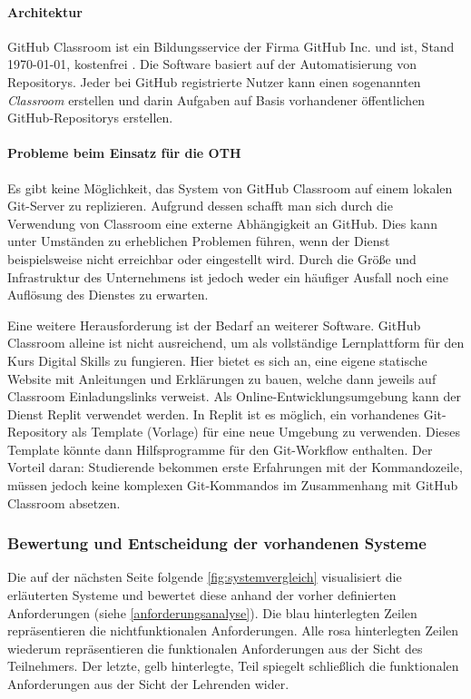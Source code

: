 \paragraph{Architektur}
GitHub Classroom ist ein Bildungsservice der Firma GitHub Inc. und ist, Stand
\today, kostenfrei \parencite{github-classroom-kostenlos}. Die Software basiert
auf der Automatisierung von Repositorys. Jeder bei GitHub registrierte Nutzer
kann einen sogenannten \emph{Classroom} erstellen und darin Aufgaben auf
Basis vorhandener öffentlichen GitHub-Repositorys erstellen.

\paragraph{Probleme beim Einsatz für die OTH}
Es gibt keine Möglichkeit, das System von GitHub Classroom auf einem lokalen
Git-Server zu replizieren. Aufgrund dessen schafft man sich durch die
Verwendung von Classroom eine externe Abhängigkeit an GitHub. Dies kann unter
Umständen zu erheblichen Problemen führen, wenn der Dienst beispielsweise
nicht erreichbar oder eingestellt wird. Durch die Größe und Infrastruktur des
Unternehmens ist jedoch weder ein häufiger Ausfall noch eine Auflösung des
Dienstes zu erwarten.

Eine weitere Herausforderung ist der Bedarf an weiterer Software. GitHub
Classroom alleine ist nicht ausreichend, um als vollständige Lernplattform für
den Kurs Digital Skills zu fungieren. Hier bietet es sich an, eine eigene
statische Website mit Anleitungen und Erklärungen zu bauen, welche dann jeweils
auf Classroom Einladungslinks verweist. Als Online-Entwicklungsumgebung kann der
Dienst Replit verwendet werden. In Replit ist es möglich, ein vorhandenes
Git-Repository als Template (Vorlage) für eine neue Umgebung zu verwenden.
Dieses Template könnte dann Hilfsprogramme für den Git-Workflow enthalten. Der
Vorteil daran: Studierende bekommen erste Erfahrungen mit der Kommandozeile,
müssen jedoch keine komplexen Git-Kommandos im Zusammenhang mit GitHub Classroom
absetzen.

\subsubsection{Bewertung und Entscheidung der vorhandenen Systeme}
Die auf der nächsten Seite folgende \autoref{fig:systemvergleich} visualisiert
die erläuterten Systeme und bewertet diese anhand der vorher definierten
Anforderungen (siehe \autoref{anforderungsanalyse}). Die blau hinterlegten
Zeilen repräsentieren die nichtfunktionalen Anforderungen. Alle rosa
hinterlegten Zeilen wiederum repräsentieren die funktionalen Anforderungen aus
der Sicht des Teilnehmers. Der letzte, gelb hinterlegte, Teil spiegelt
schließlich die funktionalen Anforderungen aus der Sicht der Lehrenden wider.

